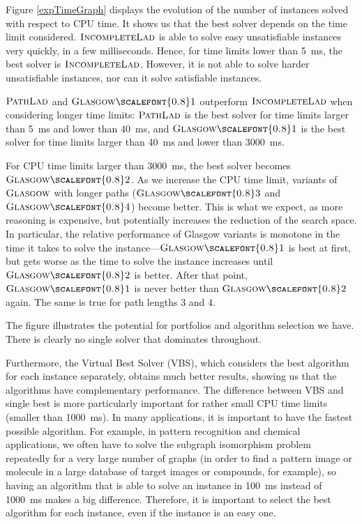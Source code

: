\documentclass{llncs}
\newcommand{\Glasgow}{$\textsc{Glasgow}$\xspace}
\newcommand{\IncompleteLAD}{$\textsc{IncompleteLad}$\xspace}
\newcommand{\PathLAD}{$\textsc{PathLad}$\xspace}
\newcommand{\GlasgowOne}{$\textsc{Glasgow{\scalefont{0.8}1}}$\xspace}
\newcommand{\GlasgowTwo}{$\textsc{Glasgow{\scalefont{0.8}2}}$\xspace}
\newcommand{\GlasgowThree}{$\textsc{Glasgow{\scalefont{0.8}3}}$\xspace}
\newcommand{\GlasgowFour}{$\textsc{Glasgow{\scalefont{0.8}4}}$\xspace}
\begin{document}
Figure \ref{expTimeGraph} displays the evolution of the number of instances solved with respect to
CPU time. It shows us that the best solver depends on the time limit considered. \IncompleteLAD is
able to solve easy unsatisfiable instances very quickly, in a few milliseconds. Hence, for time
limits lower than \SI{5}{\ms}, the best solver is \IncompleteLAD. However, it is not able to solve harder
unsatisfiable instances, nor can it solve satisfiable instances.

\PathLAD and \GlasgowOne outperform \IncompleteLAD when considering longer time limits: \PathLAD is the
best solver for time limits larger than \SI{5}{\ms} and lower than \SI{40}{\ms}, and \GlasgowOne is the best solver
for time limits larger than \SI{40}{\ms} and lower than \SI{3000}{\ms}.

For CPU time limits larger than \SI{3000}{\ms}, the best solver becomes \GlasgowTwo.  As we
increase the CPU time limit, variants of \Glasgow with longer paths (\GlasgowThree and \GlasgowFour)
become better. This is what we expect, as more reasoning is expensive, but potentially increases the
reduction of the search space. In particular, the relative performance of Glasgow variants is
monotone in the time it takes to solve the instance---\GlasgowOne is best at first, but gets worse as
the time to solve the instance increases until \GlasgowTwo is better. After that point, \GlasgowOne is
never better than \GlasgowTwo again. The same is true for path lengths 3 and 4.

The figure illustrates the potential for portfolios and algorithm selection we have. There is
clearly no single solver that dominates throughout.

Furthermore, the Virtual Best Solver (VBS), which considers the best algorithm for each instance
separately, obtains much better results, showing us that the algorithms have complementary
performance. The difference between VBS and single best is more particularly important for rather
small CPU time limits (smaller than \SI{1000}{\ms}). In many applications, it is important to have the
fastest possible algorithm. For example, in pattern recognition \cite{pr15,cviu11} and chemical
\cite{Giugno:2013} applications, we often have to solve the subgraph isomorphism problem repeatedly
for a very large number of graphs (in order to find a pattern image or molecule in a large database
of target images or compounds, for example), so having an algorithm that is able to solve an
instance in \SI{100}{\ms} instead of \SI{1000}{\ms} makes a big difference.  Therefore, it is important to select
the best algorithm for each instance, even if the instance is an easy one.
\end{document}
